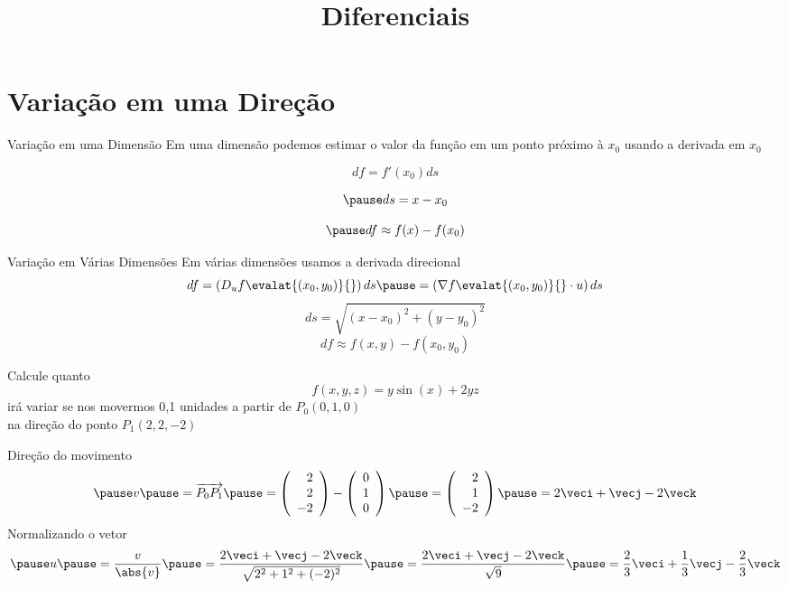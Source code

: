 \documentclass[fleqn,utf8,aspectratio=169,12pt,ignorenonframetext]{beamer}
\title{Diferenciais}
\begin{document}
\addtitle

\section{Variação em uma Direção}

\begin{frame}{Variação em uma Dimensão}
  Em uma dimensão podemos estimar o valor da função em um ponto próximo à $x_0$
  usando a derivada em $x_0$

  \pause
  \[
  df = f'(x_0) ds
  \]

  \[
  \pause
  ds = x - x_0
  \]

  \[
  \pause
  df \approx f(x) - f(x_0)
  \]
\end{frame}

\begin{frame}{Variação em Várias Dimensões}
  Em várias dimensões usamos a derivada direcional
  \pause
  \[
  df
  = \left(D_u f\evalat{(x_0, y_0)}{}\right) ds
  \pause
  = \left(\nabla f\evalat{(x_0, y_0)}{} \cdot u\right) ds
  \]
  \pause
  \[
  ds = \sqrt{(x - x_0)^2 + (y-y_0)^2}
  \]
  \pause
  \[
  df \approx f(x, y) - f(x_0, y_0)
  \]
\end{frame}

\begin{question}
  Calcule quanto
  \[
  f(x, y, z) = y\sin(x) + 2yz
  \]
  irá variar se nos movermos 0,1 unidades a partir de \(P_0(0, 1, 0)\) \\
  na direção do ponto \(P_1(2, 2, -2)\)
\end{question}

\begin{resolution}{Direção do movimento}
  \[
  \pause
  v
  \pause
  = \overrightarrow{P_0P_1}
  \pause
  = \left(\begin{array}{r} 2 \\ 2 \\ -2 \end{array}\right)
  - \left(\begin{array}{r} 0 \\ 1 \\  0 \end{array}\right)
  \pause
  = \left(\begin{array}{r} 2 \\ 1 \\  -2 \end{array}\right)
  \pause
  = 2\veci + \vecj -2\veck
  \]
  \pause
  Normalizando o vetor
  \[
  \pause
  u
  \pause
  = \frac{v}{\abs{v}}
  \pause
  = \frac{2\veci + \vecj -2\veck}{\sqrt{2^2 + 1^2 + (-2)^2}}
  \pause
  = \frac{2\veci + \vecj -2\veck}{\sqrt{9}}
  \pause
  = \frac{2}{3} \veci + \frac{1}{3} \vecj - \frac{2}{3} \veck
  \]
\end{resolution}
\end{document}

